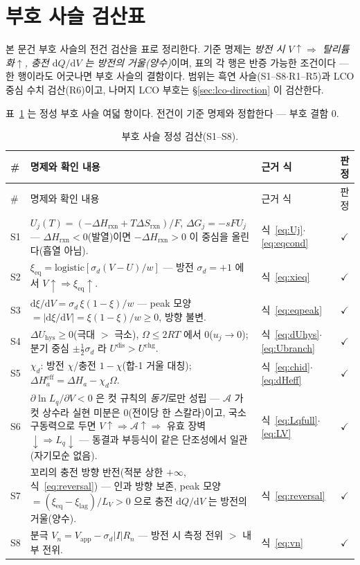 \documentclass[11pt,a4paper]{article}
\newcommand{\dd}{\mathrm{d}}
\newcommand{\eff}{\mathrm{eff}}
\newcommand{\eq}{\mathrm{eq}}
\newcommand{\app}{\mathrm{app}}
\newcommand{\rxn}{\mathrm{rxn}}
\newcommand{\dis}{\mathrm{dis}}
\newcommand{\chg}{\mathrm{chg}}
\newcommand{\hys}{\mathrm{hys}}
\begin{document}
\appendix
\section{부호 사슬 검산표}\label{sec:signcheck}
본 문건 부호 사슬의 전건 검산을 표로 정리한다. 기준 명제는 \emph{방전 시 $V\!\uparrow\Rightarrow$
탈리튬화$\uparrow$, 충전 $\dd Q/\dd V$ 는 방전의 거울(양수)}이며, 표의 각 행은 반증 가능한 조건이다 ---
한 행이라도 어긋나면 부호 사슬의 결함이다. 범위는 흑연 사슬(S1--S8$\cdot$R1--R5)과 LCO 중심 수치
검산(R6)이고, 나머지 LCO 부호는 \S\ref{sec:lco-direction} 이 검산한다.

표~\ref{tab:signcheck-S} 는 정성 부호 사슬 여덟 항이다. 전건이 기준 명제와 정합한다 --- 부호 결함 $0$.

\begin{longtable}{@{}l p{8.6cm} p{3.3cm} c@{}}
\caption{부호 사슬 정성 검산(S1--S8).}\label{tab:signcheck-S}\\
\toprule
\# & 명제와 확인 내용 & 근거 식 & 판정 \\
\midrule
\endfirsthead
\toprule
\# & 명제와 확인 내용 & 근거 식 & 판정 \\
\midrule
\endhead
S1 & $U_j(T)=(-\Delta H_\rxn+T\Delta S_\rxn)/F$, $\Delta G_j=-sFU_j$ --- $\Delta H_\rxn<0$(발열)이면
$-\Delta H_\rxn>0$ 이 중심을 올린다(흡열 아님). & 식~\eqref{eq:Uj}$\cdot$\eqref{eq:eqcond} & $\checkmark$ \\
S2 & $\xi_\eq=\mathrm{logistic}[\sigma_d(V-U)/w]$ --- 방전 $\sigma_d=+1$ 에서
$V\!\uparrow\Rightarrow\xi_\eq\!\uparrow$. & 식~\eqref{eq:xieq} & $\checkmark$ \\
S3 & $\dd\xi/\dd V=\sigma_d\,\xi(1-\xi)/w$ --- peak 모양 $=|\dd\xi/\dd V|=\xi(1-\xi)/w\ge0$, 방향 불변.
& 식~\eqref{eq:eqpeak} & $\checkmark$ \\
S4 & $\Delta U_\hys\ge0$(극대 $>$ 극소), $\Omega\le2RT$ 에서 $0$($u_j\to0$); 분기 중심 $\pm\tfrac12\sigma_d$
라 $U^{\dis}>U^{\chg}$. & 식~\eqref{eq:dUhys}$\cdot$ \eqref{eq:Ubranch} & $\checkmark$ \\
S5 & $\chi_d$: 방전 $\chi$/충전 $1-\chi$(합-1 거울 대칭); $\Delta H_a^\eff=\Delta H_a-\chi_d\Omega$.
& 식~\eqref{eq:chid}$\cdot$\eqref{eq:dHeff} & $\checkmark$ \\
S6 & $\partial\ln L_q/\partial V<0$ 은 컷 규칙의 \emph{동기}로만 성립 --- $\mathcal A$ 가 컷 상수라 실현
미분은 $0$(전이당 한 스칼라)이고, 국소 구동력으로 두면 $V\!\uparrow\Rightarrow\mathcal
A\!\uparrow\Rightarrow$ 유효 장벽 $\downarrow\Rightarrow L_q\downarrow$ --- 동결과 부등식이 같은
단조성에서 일관(자기모순 없음). & 식~\eqref{eq:Lqfull}$\cdot$\eqref{eq:LV} & $\checkmark$ \\
S7 & 꼬리의 충전 방향 반전(적분 상한 $+\infty$, 식~\eqref{eq:reversal}) --- 인과 방향 보존,
peak 모양 $=(\xi_\eq-\xi_\mathrm{lag})/L_V>0$ 으로 충전 $\dd Q/\dd V$ 는 방전의 거울(양수).
& 식~\eqref{eq:reversal} & $\checkmark$ \\
S8 & 분극 $V_n=V_\app-\sigma_d|I|R_n$ --- 방전 시 측정 전위 $>$ 내부 전위. & 식~\eqref{eq:vn} & $\checkmark$ \\
\bottomrule
\end{longtable}
\end{document}

